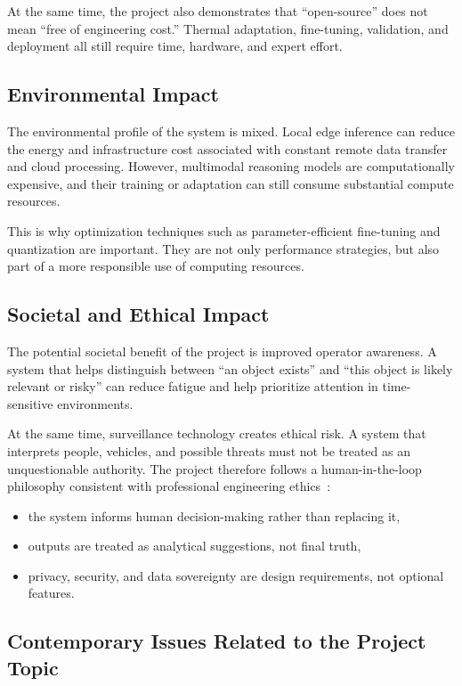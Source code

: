 At the same time, the project also demonstrates that ``open-source'' does not mean ``free of
engineering cost.'' Thermal adaptation, fine-tuning, validation, and deployment all still
require time, hardware, and expert effort.

\subsection{Environmental Impact}

The environmental profile of the system is mixed. Local edge inference can reduce the energy
and infrastructure cost associated with constant remote data transfer and cloud processing.
However, multimodal reasoning models are computationally expensive, and their training or
adaptation can still consume substantial compute resources.

This is why optimization techniques such as parameter-efficient fine-tuning and
quantization are important. They are not only performance strategies, but also part of a more
responsible use of computing resources.

\subsection{Societal and Ethical Impact}

The potential societal benefit of the project is improved operator awareness. A system that
helps distinguish between ``an object exists'' and ``this object is likely relevant or risky'' can
reduce fatigue and help prioritize attention in time-sensitive environments.

At the same time, surveillance technology creates ethical risk. A system that interprets people,
vehicles, and possible threats must not be treated as an unquestionable authority. The project
therefore follows a human-in-the-loop philosophy consistent with professional engineering
ethics~\cite{acm,ieeeethics}:

\begin{itemize}[nosep]
  \item the system informs human decision-making rather than replacing it,
  \item outputs are treated as analytical suggestions, not final truth,
  \item privacy, security, and data sovereignty are design requirements, not optional features.
\end{itemize}

\subsection{Contemporary Issues Related to the Project Topic}

